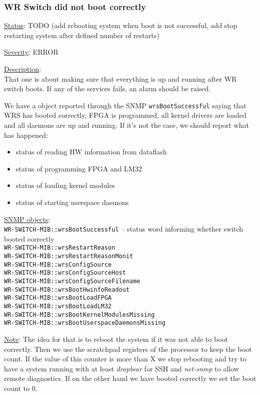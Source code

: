 \subsubsection{\bf WR Switch did not boot correctly}
		\label{fail:other:boot}
		\begin{packed_enum}
			\item [] \underline{Status}: TODO (add rebooting system when boot is
				 not successful, add stop restarting system after defined number of restarts)
			\item [] \underline{Severity}: ERROR
			\item [] \underline{Description}:\\
				That one is about making sure that everything is up and running after WR
				switch boots. If any of the services fails, an alarm should be raised.
				
				We have a object reported
				through the SNMP \texttt{wrsBootSuccessful} saying that WRS has
				booted correctly, FPGA is programmed, all kernel drivers are loaded and
				all daemons are up and running. If it's not the case, we should report
				what has happened:
				\begin{itemize}
					\item status of reading HW information from dataflash
					\item status of programming FPGA and LM32
					\item status of loading kernel modules
					\item status of starting userspace daemons
				\end{itemize}
			\item [] \underline{SNMP objects}:\\
				\texttt{WR-SWITCH-MIB::wrsBootSuccessful} -- status word informing whether switch booted correctly\\
				\texttt{WR-SWITCH-MIB::wrsRestartReason}\\
				\texttt{WR-SWITCH-MIB::wrsRestartReasonMonit}\\
				\texttt{WR-SWITCH-MIB::wrsConfigSource}\\
				\texttt{WR-SWITCH-MIB::wrsConfigSourceHost}\\
				\texttt{WR-SWITCH-MIB::wrsConfigSourceFilename}\\
				\texttt{WR-SWITCH-MIB::wrsBootHwinfoReadout}\\
				\texttt{WR-SWITCH-MIB::wrsBootLoadFPGA}\\
				\texttt{WR-SWITCH-MIB::wrsBootLoadLM32}\\
				\texttt{WR-SWITCH-MIB::wrsBootKernelModulesMissing}\\
				\texttt{WR-SWITCH-MIB::wrsBootUserspaceDaemonsMissing}
			\item [] \underline{Note}: 
				The idea for that is to reboot the system if it was not able to boot
				correctly. Then we use the scratchpad registers of the processor to keep
				the boot count. If the value of this counter is more than X we stop
				rebooting and try to have a system running with at least \emph{dropbear}
				for SSH and \emph{net-snmp} to allow remote diagnostics. If on the other
				hand we have booted correctly we set the boot count to 0.
		\end{packed_enum}


